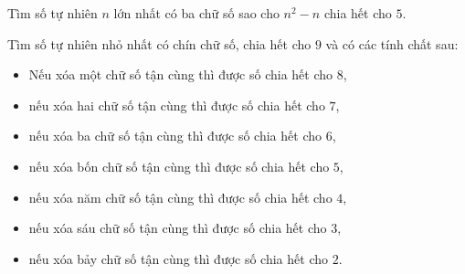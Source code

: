 \begin{bt}%
	Tìm số tự nhiên $n$ lớn nhất có ba chữ số sao cho $n^2-n$ chia hết cho $5$.
\end{bt}

\begin{bt}%
	Tìm số tự nhiên nhỏ nhất có chín chữ số, chia hết cho $9$ và có các tính chất sau:
	\begin{itemize}
		\item Nếu xóa một chữ số tận cùng thì được số chia hết cho $8$,
		\item nếu xóa hai chữ số tận cùng thì được số chia
		hết cho $7$,
		\item nếu xóa ba chữ số tận cùng thì được số chia hết cho $6$,
		\item nếu xóa bốn chữ số tận cùng thì được số chia hết cho $5$,
		\item nếu xóa năm chữ số tận cùng thì được số chia hết cho $4$,
		\item nếu xóa sáu chữ số tận cùng thì được số chia hết cho $3$,
		\item nếu xóa bảy chữ số tận cùng thì được số chia hết cho $2$.
	\end{itemize}
\end{bt}

